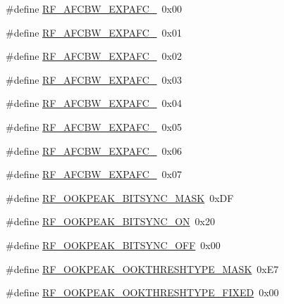\begin{DoxyCompactItemize}
\item 
\#define \mbox{\hyperlink{sx1276_regs-_fsk_8h_a8cc2a4a34787108b59e150f19a27c9a6}{R\+F\+\_\+\+A\+F\+C\+B\+W\+\_\+\+E\+X\+P\+A\+F\+C\+\_}}~0x00
\item 
\#define \mbox{\hyperlink{sx1276_regs-_fsk_8h_afe3cf2aebd859024337d286c1ab68f6a}{R\+F\+\_\+\+A\+F\+C\+B\+W\+\_\+\+E\+X\+P\+A\+F\+C\+\_}}~0x01
\item 
\#define \mbox{\hyperlink{sx1276_regs-_fsk_8h_a7b89d616e4ba9c65441deb101651f638}{R\+F\+\_\+\+A\+F\+C\+B\+W\+\_\+\+E\+X\+P\+A\+F\+C\+\_}}~0x02
\item 
\#define \mbox{\hyperlink{sx1276_regs-_fsk_8h_a93a930a33871216aaa3bc41a8bf2507b}{R\+F\+\_\+\+A\+F\+C\+B\+W\+\_\+\+E\+X\+P\+A\+F\+C\+\_}}~0x03
\item 
\#define \mbox{\hyperlink{sx1276_regs-_fsk_8h_a468c40d81d8271fa92a4331f4c3a6c74}{R\+F\+\_\+\+A\+F\+C\+B\+W\+\_\+\+E\+X\+P\+A\+F\+C\+\_}}~0x04
\item 
\#define \mbox{\hyperlink{sx1276_regs-_fsk_8h_a507cb037026ab04e1a1634a2ef8fa90b}{R\+F\+\_\+\+A\+F\+C\+B\+W\+\_\+\+E\+X\+P\+A\+F\+C\+\_}}~0x05
\item 
\#define \mbox{\hyperlink{sx1276_regs-_fsk_8h_a1ebab24d4f23c9430b1b65b670bf2b79}{R\+F\+\_\+\+A\+F\+C\+B\+W\+\_\+\+E\+X\+P\+A\+F\+C\+\_}}~0x06
\item 
\#define \mbox{\hyperlink{sx1276_regs-_fsk_8h_a99b0f60379ae9cf93b92a8108977cf1d}{R\+F\+\_\+\+A\+F\+C\+B\+W\+\_\+\+E\+X\+P\+A\+F\+C\+\_}}~0x07
\item 
\#define \mbox{\hyperlink{sx1276_regs-_fsk_8h_a07bd216fd11bb1522ddaaec499b1acc6}{R\+F\+\_\+\+O\+O\+K\+P\+E\+A\+K\+\_\+\+B\+I\+T\+S\+Y\+N\+C\+\_\+\+M\+A\+SK}}~0x\+DF
\item 
\#define \mbox{\hyperlink{sx1276_regs-_fsk_8h_a3069cb1326f97de4513e38c42efcf442}{R\+F\+\_\+\+O\+O\+K\+P\+E\+A\+K\+\_\+\+B\+I\+T\+S\+Y\+N\+C\+\_\+\+ON}}~0x20
\item 
\#define \mbox{\hyperlink{sx1276_regs-_fsk_8h_a46e977e1bee2a0285de1c083959c7bbf}{R\+F\+\_\+\+O\+O\+K\+P\+E\+A\+K\+\_\+\+B\+I\+T\+S\+Y\+N\+C\+\_\+\+O\+FF}}~0x00
\item 
\#define \mbox{\hyperlink{sx1276_regs-_fsk_8h_ae957050c27e9149fe25fae7276d721ec}{R\+F\+\_\+\+O\+O\+K\+P\+E\+A\+K\+\_\+\+O\+O\+K\+T\+H\+R\+E\+S\+H\+T\+Y\+P\+E\+\_\+\+M\+A\+SK}}~0x\+E7
\item 
\#define \mbox{\hyperlink{sx1276_regs-_fsk_8h_a9d2ecb9366c343ab004e496ac9ceb599}{R\+F\+\_\+\+O\+O\+K\+P\+E\+A\+K\+\_\+\+O\+O\+K\+T\+H\+R\+E\+S\+H\+T\+Y\+P\+E\+\_\+\+F\+I\+X\+ED}}~0x00

\end{DoxyCompactItemize}
